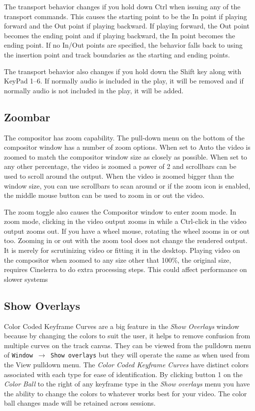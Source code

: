 The transport behavior changes if you hold down Ctrl when issuing any of the transport commands. This causes the starting point to be the In point if playing forward and the Out point if playing backward. If playing forward, the Out point becomes the ending point and if playing backward, the In point becomes the ending point. If no In/Out points are specified, the behavior falls back to using the insertion point and track boundaries as the starting and ending points.

The transport behavior also changes if you hold down the Shift key along with KeyPad 1--6.  
If normally audio is included in the play, it will be removed and if normally audio is not included in the play, it will be added.


\subsection{Zoombar}%
\label{sub:zoombar}

The compositor has zoom capability. 
The pull-down menu on the bottom of the compositor window has a number of zoom options. 
When set to Auto the video is zoomed to match the compositor window size as closely as possible. 
When set to any other percentage, the video is zoomed a power of 2 and scrollbars can be used to scroll around the output. 
When the video is zoomed bigger than the window size,  you can use scrollbars to scan around or if the zoom icon is enabled, the middle mouse button can be used to zoom in or out the video.

The zoom toggle also causes the Compositor window to enter zoom mode. 
In zoom mode, clicking in the video output zooms in while a Ctrl-click in the video output zooms out. 
If you have a wheel mouse, rotating the wheel zooms in or out too. 
Zooming in or out with the zoom tool does not change the rendered output. 
It is merely for scrutinizing video or fitting it in the desktop. Playing video on the compositor when zoomed to any size other that 100\%, the original size, requires Cinelerra to do extra processing steps. 
This could affect performance on slower systems

\subsection{Show Overlays}%
\label{sub:show_overlays}

Color Coded Keyframe Curves are a big feature in the \textit{Show Overlays} window because by changing the colors to suit the user, it helps to remove confusion from multiple curves on the track canvas.  
They can be viewed from the pulldown menu of \texttt{Window $\rightarrow$ Show overlays} but they will operate the same as when used from the View pulldown menu.  
The \textit{Color Coded Keyframe Curves} have distinct colors associated with each type for ease of identification.  
By clicking button 1 on the \textit{Color Ball} to the right of any keyframe type in the \textit{Show overlays} menu you have the ability to change the colors to whatever works best for your video.  
The color ball changes made will be retained across sessions.

